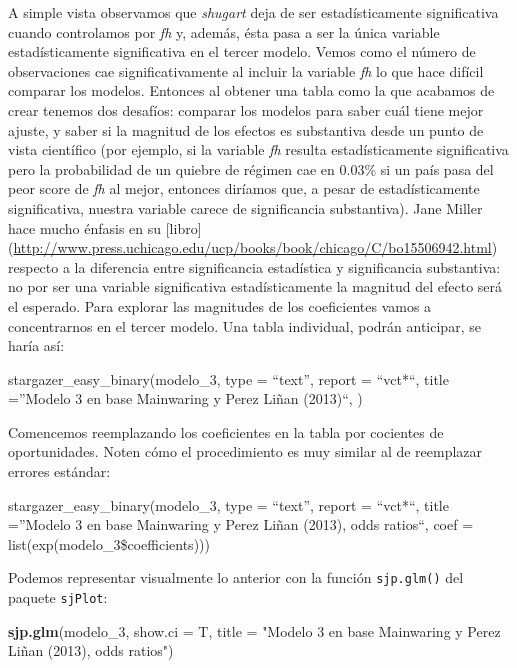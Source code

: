 \documentclass[]{book}
\newenvironment{Shaded}{\begin{snugshade}}{\end{snugshade}}
\newcommand{\KeywordTok}[1]{\textcolor[rgb]{0.13,0.29,0.53}{\textbf{#1}}}
\newcommand{\DataTypeTok}[1]{\textcolor[rgb]{0.13,0.29,0.53}{#1}}
\newcommand{\DecValTok}[1]{\textcolor[rgb]{0.00,0.00,0.81}{#1}}
\newcommand{\StringTok}[1]{\textcolor[rgb]{0.31,0.60,0.02}{#1}}
\newcommand{\NormalTok}[1]{#1}
\begin{document}
A simple vista observamos que \emph{shugart} deja de ser
estadísticamente significativa cuando controlamos por \emph{fh} y,
además, ésta pasa a ser la única variable estadísticamente significativa
en el tercer modelo. Vemos como el número de observaciones cae
significativamente al incluir la variable \emph{fh} lo que hace difícil
comparar los modelos. Entonces al obtener una tabla como la que acabamos
de crear tenemos dos desafíos: comparar los modelos para saber cuál
tiene mejor ajuste, y saber si la magnitud de los efectos es substantiva
desde un punto de vista científico (por ejemplo, si la variable
\emph{fh} resulta estadísticamente significativa pero la probabilidad de
un quiebre de régimen cae en 0.03\% si un país pasa del peor score de
\emph{fh} al mejor, entonces diríamos que, a pesar de estadísticamente
significativa, nuestra variable carece de significancia substantiva).
Jane Miller hace mucho énfasis en su {[}libro{]}
(\url{http://www.press.uchicago.edu/ucp/books/book/chicago/C/bo15506942.html})
respecto a la diferencia entre significancia estadística y significancia
substantiva: no por ser una variable significativa estadísticamente la
magnitud del efecto será el esperado. Para explorar las magnitudes de
los coeficientes vamos a concentrarnos en el tercer modelo. Una tabla
individual, podrán anticipar, se haría así:

stargazer\_easy\_binary(modelo\_3, type = ``text'', report = ``vct*``,
title =''Modelo 3 en base Mainwaring y Perez Liñan (2013)``, )

Comencemos reemplazando los coeficientes en la tabla por cocientes de
oportunidades. Noten cómo el procedimiento es muy similar al de
reemplazar errores estándar:

stargazer\_easy\_binary(modelo\_3, type = ``text'', report = ``vct*``,
title =''Modelo 3 en base Mainwaring y Perez Liñan (2013), odds
ratios``, coef = list(exp(modelo\_3\$coefficients)))

Podemos representar visualmente lo anterior con la función
\texttt{sjp.glm()} del paquete \texttt{sjPlot}:

\begin{Shaded}
\begin{Highlighting}[]
\KeywordTok{sjp.glm}\NormalTok{(modelo_}\DecValTok{3}\NormalTok{, }
        \DataTypeTok{show.ci     =}\NormalTok{ T,}
        \DataTypeTok{title       =} \StringTok{"Modelo 3 en base Mainwaring y Perez Liñan (2013), odds ratios"}\NormalTok{)}
\end{Highlighting}
\end{Shaded}
\end{document}
